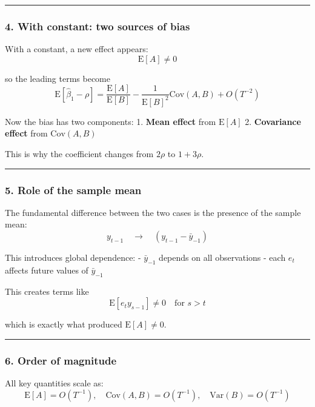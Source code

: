 \documentclass[11pt]{article}
\begin{document}
\begin{center}\rule{0.5\linewidth}{0.5pt}\end{center}

\subsubsection{4. With constant: two sources of
bias}\label{with-constant-two-sources-of-bias}

With a constant, a new effect appears: \[
\text{E}[A] \neq 0
\]

so the leading terms become \[
\text{E}[\hat\beta_1 - \rho]
=
\frac{\text{E}[A]}{\text{E}[B]}
-\frac{1}{\text{E}[B]^2}\text{Cov}(A,B)
+O(T^{-2})
\]

Now the bias has two components: 1. \textbf{Mean effect} from
\(\text{E}[A]\) 2. \textbf{Covariance effect} from \(\text{Cov}(A,B)\)

This is why the coefficient changes from \(2\rho\) to \(1+3\rho\).

\begin{center}\rule{0.5\linewidth}{0.5pt}\end{center}

\subsubsection{5. Role of the sample
mean}\label{role-of-the-sample-mean}

The fundamental difference between the two cases is the presence of the
sample mean: \[
y_{t-1} \quad \longrightarrow \quad (y_{t-1} - \bar y_{-1})
\]

This introduces global dependence: - \(\bar y_{-1}\) depends on all
observations - each \(e_t\) affects future values of \(\bar y_{-1}\)

This creates terms like \[
\text{E}[e_t y_{s-1}] \neq 0 \quad \text{for } s>t
\]

which is exactly what produced \(\text{E}[A] \neq 0\).

\begin{center}\rule{0.5\linewidth}{0.5pt}\end{center}

\subsubsection{6. Order of magnitude}\label{order-of-magnitude}

All key quantities scale as: \[
\text{E}[A] = O(T^{-1}), \quad
\text{Cov}(A,B) = O(T^{-1}), \quad
\text{Var}(B) = O(T^{-1})
\]
\end{document}

